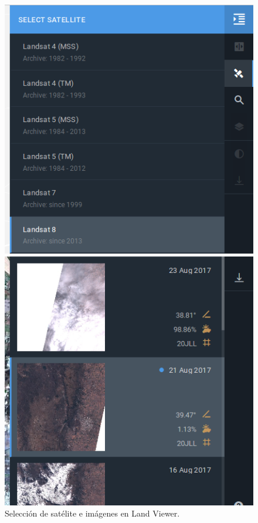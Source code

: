 \documentclass[a4paper,12pt]{book}
\begin{document}
\begin{figure}[h!]
\centering
\begin{minipage}{.425\linewidth}
  \includegraphics[width=\linewidth]{fig:sat.png}
\end{minipage}
\hspace{.05\linewidth}
\begin{minipage}{.425\linewidth}
  \includegraphics[width=\linewidth]{fig:imagen1.png}
\end{minipage}
\caption{Selección de satélite e imágenes en Land Viewer.}
\label{fig:scene}
\end{figure}
\end{document}
